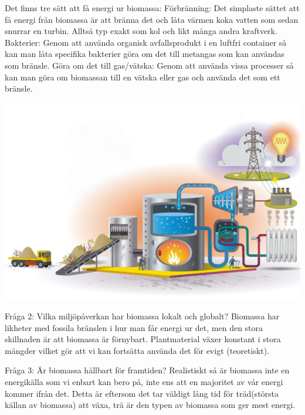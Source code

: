\documentclass[11p]{article}
\begin{document}
      Det finns tre sätt att få energi ur biomassa:
      Förbränning: Det simplaste sättet att få energi från biomassa är att bränna det och låta värmen
     koka vatten som sedan snurrar en turbin. Alltså typ exakt som kol och likt många andra kraftverk.
      Bakterier: Genom att använda organisk avfallsprodukt i en luftfri container så kan man låta specifika
     bakterier göra om det till metangas som kan användas som bränsle.
      Göra om det till gas/vätska: Genom att använda vissa processer så kan man göra om biomassan till en
     vätska eller gas och använda det som ett bränsle.

     \includegraphics[scale=0.5]{kraftvarmeverk-1210x807}

       Fråga 2:
      Vilka miljöpåverkan har biomassa lokalt och globalt?
      Biomassa har likheter med fossila bränslen i hur man får energi ur det, men den stora skillnaden är
     att biomassa är förnybart. Plantmaterial växer konstant i stora mängder vilket gör att vi kan fortsätta
     använda det för evigt (teoretiskt).


      Fråga 3:
      Är biomassa hållbart för framtiden?
      Realistiskt så är biomassa inte en energikälla som vi enbart kan bero på, inte ens att en majoritet av
    vår energi kommer ifrån det. Detta är eftersom det tar väldigt lång tid för träd(största källan av biomassa)
    att växa, trä är den typen av biomassa som ger mest energi. \parencite{BiomassaVF}

\printbibliography
\end{document}
